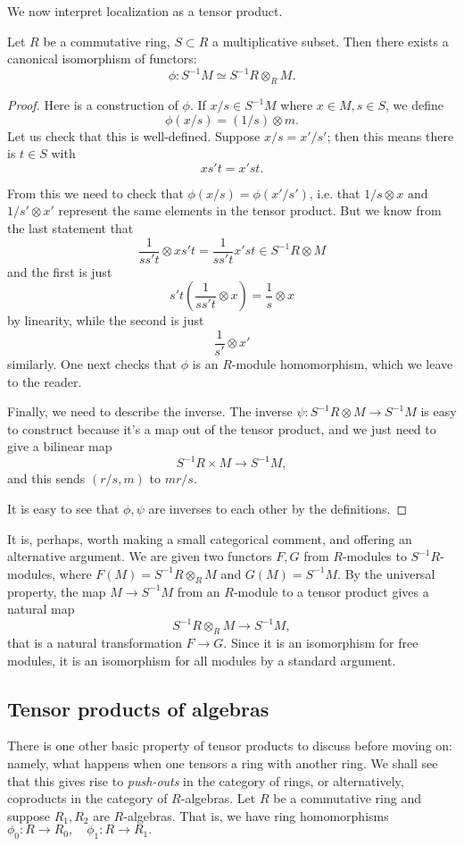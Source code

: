 We now interpret localization as a tensor product.
\begin{proposition} \label{locisbasechange}
Let $R$ be a commutative ring, $S \subset R$ a multiplicative subset. Then
there
exists a canonical isomorphism of functors:
\[ \phi:  S^{-1}M \simeq S^{-1 }R \otimes_R M . \]
\end{proposition}
\begin{proof}
Here is a construction of $\phi$. If $x/s \in S^{-1}M$ where $x \in M, s \in
S$, we define
\[ \phi(x/s) = (1/s) \otimes m.  \]
Let us check that this is well-defined. Suppose $x/s = x'/s'$; then this means
there is $t \in S$ with
\[ xs't = x'st . \]

From this we need to check that $\phi(x/s) = \phi(x'/s')$, i.e. that $1/s
\otimes x$ and $1/s' \otimes x'$ represent the same elements in the tensor
product. But we know from the last statement that
\[ \frac{1}{ss't} \otimes xs't = \frac{1}{ss't} x'st \in S^{-1}R \otimes M \]
and the first is just
\[ s't( \frac{1}{ss't} \otimes x) = \frac{1}{s} \otimes x  \]
by linearity, while the second is just
\[ \frac{1}{s'} \otimes x'  \]
similarly. One next checks that $\phi$ is an $R$-module homomorphism, which we
leave to the reader.

Finally, we need to describe the inverse. The inverse $\psi: S^{-1}R \otimes M
\to S^{-1}M$ is easy to construct because it's a map out of the tensor product,
and we just need to give a bilinear map
\[ S^{-1} R \times M \to S^{-1}M , \]
and this sends $(r/s, m)$ to $mr/s$.

It is easy to see that $\phi, \psi$ are inverses to each other by the
definitions.
\end{proof}

It is, perhaps, worth making a small categorical comment, and offering an
alternative argument.
We are given two functors $F,G$ from $R$-modules to $S^{-1}R$-modules, where
$F(M) = S^{-1}R \otimes_R M$ and $G(M) = S^{-1}M$.
By the universal property, the map $M \to S^{-1}M$ from an $R$-module to a
tensor product gives  a natural map
\[ S^{-1}R \otimes_R M \to S^{-1}M,  \]
that is a natural transformation $F \to G$.
Since it is an isomorphism for free modules, it is an isomorphism for all
modules by a standard argument.


\subsection{Tensor products of algebras}
There is one other basic property of tensor products to discuss before moving
on: namely, what happens when one tensors a ring with another ring. We shall
see that this gives rise to  \emph{push-outs} in the category of rings, or
alternatively, coproducts in the category of $R$-algebras.
Let $R$ be a commutative ring and suppose $R_1, R_2$ are $R$-algebras. That is,  we have ring homomorphisms
\( \phi_0: R \to R_0, \quad \phi_1: R \to R_1.	\)

